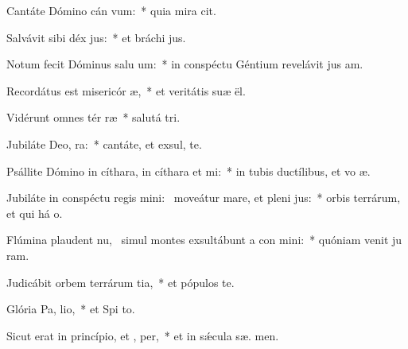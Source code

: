 \item Cantáte Dómino cán vum:~* quia mira cit.
\item Salvávit sibi déx jus:~* et bráchi  jus.
\item Notum fecit Dóminus salu um:~* in conspéctu Géntium revelávit jus am.
\item Recordátus est misericór æ,~* et veritátis suæ  ël.
\item Vidérunt omnes tér ræ~* salutá  tri.
\item Jubiláte Deo,  ra:~* cantáte, et exsul,  te.
\item Psállite Dómino in cíthara, in cíthara et  mi:~* in tubis ductílibus, et vo  æ.
\item Jubiláte in conspéctu regis mini:~\pscross{} moveátur mare, et pleni jus:~* orbis terrárum, et qui há  o.
\item Flúmina plaudent nu,~\pscross{} simul montes exsultábunt a con mini:~* quóniam venit ju ram.
\item Judicábit orbem terrárum  tia,~* et pópulos  te.
\item Glória Pa,  lio,~* et Spi to.
\item Sicut erat in princípio, et ,  per,~* et in sǽcula sæ. men.
